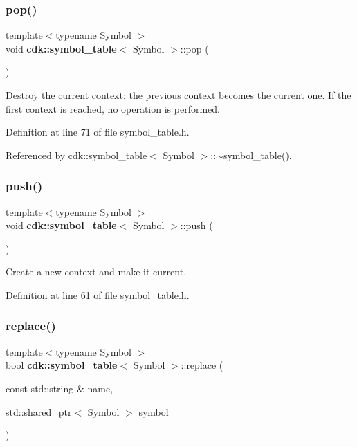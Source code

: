 \subsubsection{pop()}
{\footnotesize\ttfamily template$<$typename Symbol $>$ \\
void \textbf{ cdk\+::symbol\+\_\+table}$<$ Symbol $>$\+::pop (\begin{DoxyParamCaption}{ }\end{DoxyParamCaption})\hspace{0.3cm}{\ttfamily [inline]}}

Destroy the current context\+: the previous context becomes the current one. If the first context is reached, no operation is performed. 

Definition at line 71 of file symbol\+\_\+table.\+h.



Referenced by cdk\+::symbol\+\_\+table$<$ Symbol $>$\+::$\sim$symbol\+\_\+table().

\mbox{\label{classcdk_1_1symbol__table_a7fb69759db941faf1c57631110263988}} 
\subsubsection{push()}
{\footnotesize\ttfamily template$<$typename Symbol $>$ \\
void \textbf{ cdk\+::symbol\+\_\+table}$<$ Symbol $>$\+::push (\begin{DoxyParamCaption}{ }\end{DoxyParamCaption})\hspace{0.3cm}{\ttfamily [inline]}}

Create a new context and make it current. 

Definition at line 61 of file symbol\+\_\+table.\+h.

\mbox{\label{classcdk_1_1symbol__table_a887f0b22fc52c38db603edc2204c578e}} 
\subsubsection{replace()}
{\footnotesize\ttfamily template$<$typename Symbol $>$ \\
bool \textbf{ cdk\+::symbol\+\_\+table}$<$ Symbol $>$\+::replace (\begin{DoxyParamCaption}\item[{const std\+::string \&}]{name,  }\item[{std\+::shared\+\_\+ptr$<$ Symbol $>$}]{symbol }\end{DoxyParamCaption})\hspace{0.3cm}{\ttfamily [inline]}}

